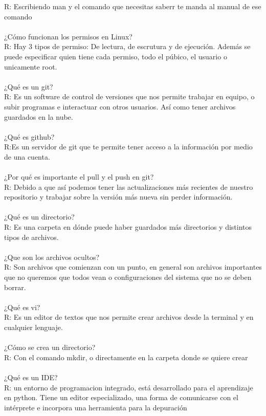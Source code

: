 \documentclass [letterpaper, 12 pts, oneside]{article}
\begin{document}
	R: Escribiendo man y el comando que necesitas saberr te manda al manual de ese comando\\
	\\
	¿Cómo funcionan los permisos en Linux?\\
	R: Hay 3 tipos de permiso: De lectura, de escrutura y de ejecución. Además se puede especificar quien tiene cada permiso, todo el púbico, el usuario o unicamente root.\\
	\\ 
	¿Qué es un git?\\
	R: Es un software de control de versiones que nos permite trabajar en equipo, o subir programas e interactuar con otros usuarios. Así como tener archivos guardados en la nube.
	\\
	\\
	¿Qué es github?\\
	R:Es un servidor de git que te permite tener acceso a la información por medio de una cuenta.\\
	\\
	¿Por qué es importante el pull y el push en git?\\
	R: Debido a que así podemos tener las actualizaciones más recientes de nuestro repositorio y trabajar sobre la versión más nueva sin perder información.\\
	\\  
	¿Qué es un directorio?\\
	R: Es una carpeta en dónde puede haber guardados más directorios y distintos tipos de archivos.\\
	\\
	¿Que son los archivos ocultos?\\
	R: Son archivos que comienzan con un punto, en general son archivos importantes que no queremos que todos vean o configuraciones del sistema que no se deben borrar.\\
	\\
	¿Qué es vi?\\
	R: Es un editor de textos que nos permite crear archivos desde la terminal y en cualquier lenguaje.\\
	\\
	¿Cómo se crea un directorio?\\
	R: Con el comando mkdir, o directamente en la carpeta donde se quiere crear\\
	\\
	¿Qué es un IDE?\\
	R: un entorno de programacion integrado, está desarrollado para el aprendizaje en python. Tiene un editor especializado, una forma de comunicarse con el intérprete e incorpora una herramienta para la depuración \\
\end{document}
